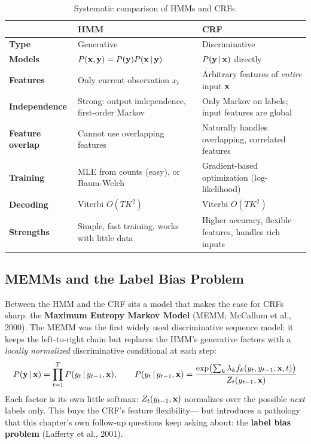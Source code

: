 \begin{table}[H]
\centering
\caption{Systematic comparison of HMMs and CRFs.}
\label{tab:hmm_vs_crf}
\begin{tabularx}{\textwidth}{>{\bfseries}l X X}
\toprule
& \textbf{HMM} & \textbf{CRF} \\
\midrule
Type & Generative & Discriminative \\
Models & $P(\mathbf{x}, \mathbf{y}) = P(\mathbf{y}) P(\mathbf{x} \,|\, \mathbf{y})$ & $P(\mathbf{y} \,|\, \mathbf{x})$ directly \\
Features & Only current observation $x_t$ & Arbitrary features of \emph{entire} input $\mathbf{x}$ \\
Independence & Strong: output independence, first-order Markov & Only Markov on labels; input features are global \\
Feature overlap & Cannot use overlapping features & Naturally handles overlapping, correlated features \\
Training & MLE from counts (easy), or Baum-Welch & Gradient-based optimization (log-likelihood) \\
Decoding & Viterbi $O(TK^2)$ & Viterbi $O(TK^2)$ \\
Strengths & Simple, fast training, works with little data & Higher accuracy, flexible features, handles rich inputs \\
\bottomrule
\end{tabularx}
\end{table}

\subsection{MEMMs and the Label Bias Problem}
\label{sec:label_bias}

Between the HMM and the CRF sits a model that makes the case for CRFs sharp:
the \textbf{Maximum Entropy Markov Model} (MEMM; McCallum et al., 2000).  The
MEMM was the first widely used discriminative sequence model: it keeps the
left-to-right chain but replaces the HMM's generative factors with a
\emph{locally normalized} discriminative conditional at each step:
\begin{equation}
P(\mathbf{y} \,|\, \mathbf{x}) = \prod_{t=1}^{T} P(y_t \,|\, y_{t-1}, \mathbf{x}),
\qquad
P(y_t \,|\, y_{t-1}, \mathbf{x})
= \frac{\exp\bigl(\sum_k \lambda_k f_k(y_t, y_{t-1}, \mathbf{x}, t)\bigr)}{Z_t(y_{t-1}, \mathbf{x})}
\label{eq:memm}
\end{equation}
Each factor is its own little softmax: $Z_t(y_{t-1}, \mathbf{x})$ normalizes over the
possible \emph{next} labels only.  This buys the CRF's feature flexibility---
but introduces a pathology that this chapter's own follow-up questions keep
asking about: the \textbf{label bias problem} (Lafferty et al., 2001).

